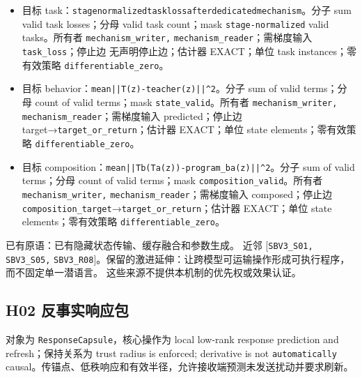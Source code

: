 \documentclass[
  10pt,
]{article}
\begin{document}
\begin{itemize}
\item
  目标
  task：{\small\nolinkurl{stage}\hspace{0.333em}\nolinkurl{normalized}\hspace{0.333em}\nolinkurl{task}\hspace{0.333em}\nolinkurl{loss}\hspace{0.333em}\nolinkurl{after}\hspace{0.333em}\nolinkurl{dedicated}\hspace{0.333em}\nolinkurl{mechanism}}。分子
  sum valid task losses；分母 valid task count；mask
  \nolinkurl{stage-normalized} valid tasks。所有者
  \nolinkurl{mechanism_writer,} \nolinkurl{mechanism_reader}；需梯度输入
  \nolinkurl{task_loss}；停止边 无声明停止边；估计器 EXACT；单位 task
  instances；零有效策略 \nolinkurl{differentiable_zero}。
\item
  目标
  behavior：{\small\nolinkurl{mean}\hspace{0.333em}\nolinkurl{||T(z)-teacher(z)||^2}}。分子
  sum of valid terms；分母 count of valid terms；mask
  \nolinkurl{state_valid}。所有者 \nolinkurl{mechanism_writer,}
  \nolinkurl{mechanism_reader}；需梯度输入 predicted；停止边
  target→\nolinkurl{target_or_return}；估计器 EXACT；单位 state
  elements；零有效策略 \nolinkurl{differentiable_zero}。
\item
  目标
  composition：{\small\nolinkurl{mean}\hspace{0.333em}\nolinkurl{||Tb(Ta(z))-program_ba(z)||^2}}。分子
  sum of valid terms；分母 count of valid terms；mask
  \nolinkurl{composition_valid}。所有者 \nolinkurl{mechanism_writer,}
  \nolinkurl{mechanism_reader}；需梯度输入 composed；停止边
  \nolinkurl{composition_target}→\nolinkurl{target_or_return}；估计器
  EXACT；单位 state elements；零有效策略
  \nolinkurl{differentiable_zero}。
\end{itemize}

已有原语：已有隐藏状态传输、缓存融合和参数生成。 近邻
{[}\nolinkurl{SBV3_S01,} \nolinkurl{SBV3_S05,}
\nolinkurl{SBV3_R08}{]}。保留的激进延伸：让跨模型可运输操作形成可执行程序，而不固定单一潜语言。
这些来源不提供本机制的优先权或效果认证。

\subsection{H02
反事实响应包}\label{h02-ux53cdux4e8bux5b9eux54cdux5e94ux5305}

对象为 \nolinkurl{ResponseCapsule}，核心操作为 local low-rank response
prediction and refresh；保持关系为 trust radius is enforced; derivative
is not \nolinkurl{automatically}
causal。传锚点、低秩响应和有效半径，允许接收端预测未发送扰动并要求刷新。
\end{document}
